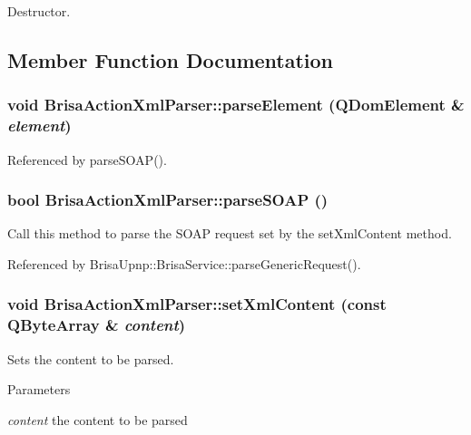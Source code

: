 Destructor. 

\subsection{Member Function Documentation}
\hypertarget{classBrisaUpnp_1_1BrisaActionXmlParser_a0e9a584388baa3a61d34a4adbcbf811b}{
\subsubsection[{parseElement}]{\setlength{\rightskip}{0pt plus 5cm}void BrisaActionXmlParser::parseElement (QDomElement \& {\em element})}}
\label{classBrisaUpnp_1_1BrisaActionXmlParser_a0e9a584388baa3a61d34a4adbcbf811b}


Referenced by parseSOAP().\hypertarget{classBrisaUpnp_1_1BrisaActionXmlParser_a95da43fde3ebe9601a08b6a2d8ca56ac}{
\subsubsection[{parseSOAP}]{\setlength{\rightskip}{0pt plus 5cm}bool BrisaActionXmlParser::parseSOAP ()}}
\label{classBrisaUpnp_1_1BrisaActionXmlParser_a95da43fde3ebe9601a08b6a2d8ca56ac}


Call this method to parse the SOAP request set by the setXmlContent method. 

Referenced by BrisaUpnp::BrisaService::parseGenericRequest().\hypertarget{classBrisaUpnp_1_1BrisaActionXmlParser_a39f1a93ab753a93974a649f590ff03d6}{
\subsubsection[{setXmlContent}]{\setlength{\rightskip}{0pt plus 5cm}void BrisaActionXmlParser::setXmlContent (const QByteArray \& {\em content})}}
\label{classBrisaUpnp_1_1BrisaActionXmlParser_a39f1a93ab753a93974a649f590ff03d6}


Sets the content to be parsed. 
\begin{DoxyParams}{Parameters}
\item[{\em content}]the content to be parsed \end{DoxyParams}


